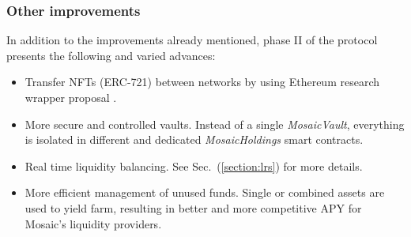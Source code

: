\subsubsection*{Other improvements}
In addition to the improvements already mentioned, phase II of the protocol presents the following and varied advances:

\begin{itemize}
    \item Transfer NFTs (ERC-721) between networks by using Ethereum research wrapper proposal \cite{WhyPropertiesb}.
    \item More secure and controlled vaults. Instead of a single \textit{MosaicVault}, everything is isolated in different and dedicated \textit{MosaicHoldings} smart contracts.
    \item Real time liquidity balancing. See Sec.~(\ref{section:lrs}) for more details.
    \item More efficient management of unused funds. Single or combined assets are used to yield farm, resulting in better and more competitive APY for Mosaic's liquidity providers.
\end{itemize}
